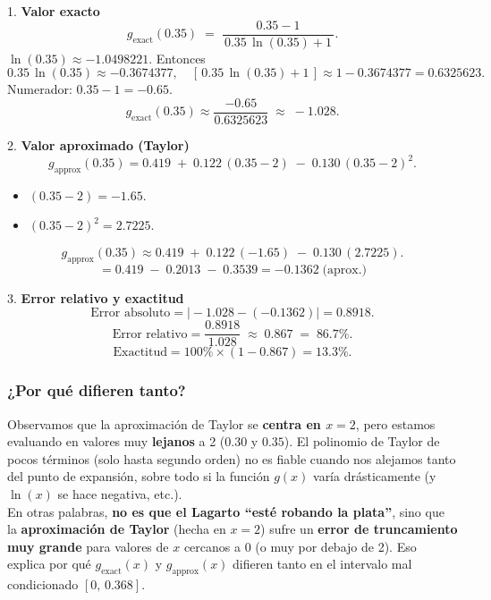 1. \textbf{Valor exacto} 
   \[
   g_{\text{exact}}(0.35)
   \;=\; \frac{0.35 - 1}{\,0.35\,\ln(0.35)+1\,}.
   \]
   \(\ln(0.35)\approx -1.0498221\). Entonces  
   \[
   0.35\,\ln(0.35)\approx -0.3674377,
   \quad
   [\,0.35\,\ln(0.35)+1\,]\approx 1 - 0.3674377 = 0.6325623.
   \]
   Numerador: \(0.35 - 1 = -0.65.\)  
   \[
   g_{\text{exact}}(0.35)
   \approx \frac{-0.65}{0.6325623}
   \;\approx\;-1.028.
   \]

2. \textbf{Valor aproximado (Taylor)}
   \[
   g_{\text{approx}}(0.35)
   = 0.419 
     \;+\;0.122\,(0.35-2)
     \;-\;0.130\,(0.35-2)^{2}.
   \]
   \begin{itemize}

   \item \((0.35 - 2) = -1.65.\)
   \item \((0.35 - 2)^2 = 2.7225.\)  
   
    \end{itemize}
   \[
   g_{\text{approx}}(0.35)
   \approx 0.419 
     \;+\;0.122\,(-1.65)
     \;-\;0.130\,(2.7225).
   \]
   \[
   = 0.419 
     \;-\;0.2013
     \;-\;0.3539
   = -0.1362 \;\text{(aprox.)}
   \]

3. \textbf{Error relativo y exactitud}
   \[
   \text{Error absoluto} 
   = \bigl|-1.028 - (-0.1362)\bigr|
   = 0.8918.
   \]
   \[
   \text{Error relativo}
   = \frac{0.8918}{1.028}
   \;\approx\;0.867 \;=\;86.7\%.
   \]
   \[
   \text{Exactitud}
   = 100\%\times (1 - 0.867)
   = 13.3\%.
   \]

\subsubsection{¿Por qué difieren tanto?}

Observamos que la aproximación de Taylor se \textbf{centra en \(x=2\)}, pero estamos evaluando en valores muy \textbf{lejanos} a 2 (\(0.30\) y \(0.35\)). El polinomio de Taylor de pocos términos (solo hasta segundo orden) no es fiable cuando nos alejamos tanto del punto de expansión, sobre todo si la función \(g(x)\) varía drásticamente (y \(\ln(x)\) se hace negativa, etc.).\\

En otras palabras, \textbf{no es que el Lagarto “esté robando la plata”}, sino que la \textbf{aproximación de Taylor} (hecha en \(x=2\)) sufre un \textbf{error de truncamiento muy grande} para valores de \(x\) cercanos a 0 (o muy por debajo de 2). Eso explica por qué \(g_{\text{exact}}(x)\) y \(g_{\text{approx}}(x)\) difieren tanto en el intervalo mal condicionado \([0,\,0.368]\).  

